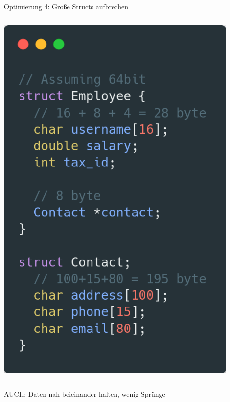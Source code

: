 \documentclass{beamer}
\begin{document}
\begin{frame}{Optimierung 4: Gro\ss{}e Structs aufbrechen}
\begin{columns}
\begin{column}{0.5\textwidth}
  \centerline{\includegraphics[width=0.9\textwidth]{breakup2.png}}
    \end{column}
  \end{columns}
  \pause
  AUCH: Daten nah beieinander halten, wenig Sprünge
\end{frame}
\end{document}
